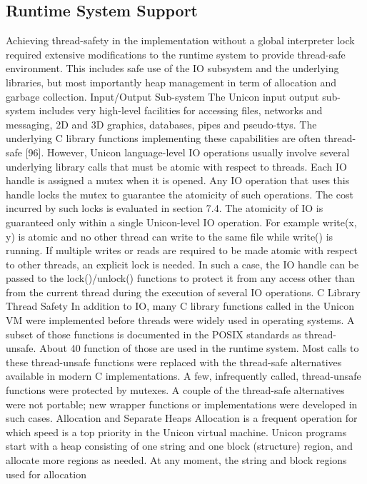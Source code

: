 \subsection{Runtime System Support}
Achieving thread-safety in the implementation without a global interpreter lock required
extensive modifications to the runtime system to provide thread-safe environment.
This includes safe use of the IO subsystem and the underlying libraries, but most
importantly heap management in term of allocation and garbage collection.
Input/Output Sub-system
The Unicon input output sub-system includes very high-level facilities for accessing files,
networks and messaging, 2D and 3D graphics, databases, pipes and pseudo-ttys. The underlying
C library functions implementing these capabilities are often thread- safe [96]. However,
Unicon language-level IO operations usually involve several underlying library calls that must
be atomic with respect to threads. Each IO handle is assigned a mutex when it is opened.
Any IO operation that uses this handle locks the mutex to guarantee the atomicity of such
operations. The cost incurred by such locks is evaluated in section 7.4. 
The atomicity of IO is guaranteed only within a single Unicon-level IO operation. For example
write(x, y) is atomic and no other thread can write to the same file while write() is running.
If multiple writes or reads are required to be made atomic with respect to other threads,
an explicit lock is needed. In such a case, the IO handle can be passed to the lock()/unlock()
functions to protect it from any access other than from the current thread during the execution
of several IO operations. 
C Library Thread Safety
In addition to IO, many C library functions called in the Unicon VM were implemented before
threads were widely used in operating systems. A subset of those functions is documented in
the POSIX standards as thread-unsafe. About 40 function of those are used in the runtime system.
Most calls to these thread-unsafe functions were replaced with the thread-safe alternatives available
in modern C implementations. A few, infrequently called, thread-unsafe functions were protected by
mutexes. A couple of the thread-safe alternatives were not portable; new wrapper functions or
implementations were developed in such cases.
Allocation and Separate Heaps
Allocation is a frequent operation for which speed is a top priority in the Unicon virtual machine.
Unicon programs start with a heap consisting of one string and one block (structure) region,
and allocate more regions as needed. At any moment, the string and block regions used for allocation
